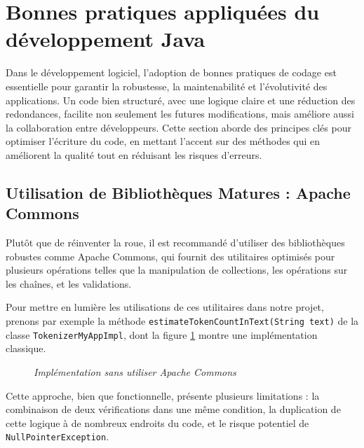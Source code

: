 \documentclass[12pt,a4paper]{report}
\begin{document}
	\section{Bonnes pratiques appliquées du développement Java}
	
	Dans le développement logiciel, l'adoption de bonnes pratiques de codage est essentielle pour garantir la robustesse, la maintenabilité et l'évolutivité des applications. Un code bien structuré, avec une logique claire et une réduction des redondances, facilite non seulement les futures modifications, mais améliore aussi la collaboration entre développeurs. Cette section aborde des principes clés pour optimiser l'écriture du code, en mettant l'accent sur des méthodes qui en améliorent la qualité tout en réduisant les risques d'erreurs.
	
	\subsection{Utilisation de Bibliothèques Matures : Apache Commons}
	
	Plutôt que de réinventer la roue, il est recommandé d’utiliser des bibliothèques robustes comme Apache Commons, qui fournit des utilitaires optimisés pour plusieurs opérations telles que la manipulation de collections, les opérations sur les chaînes, et les validations.
	
	Pour mettre en lumière les utilisations de ces utilitaires dans notre projet, prenons par exemple la méthode \verb|estimateTokenCountInText(String text)| de la classe \verb|TokenizerMyAppImpl|, dont la figure \ref{fig:before-string-utils} montre une implémentation classique.
	
	\begin{figure}[H]
		\centering
		\caption{\textit{Implémentation sans utiliser Apache Commons}}
		\label{fig:before-string-utils}
	\end{figure}
	
	Cette approche, bien que fonctionnelle, présente plusieurs limitations : la combinaison de deux vérifications dans une même condition, la duplication de cette logique à de nombreux endroits du code, et le risque potentiel de \verb|NullPointerException|.
	
\end{document}
